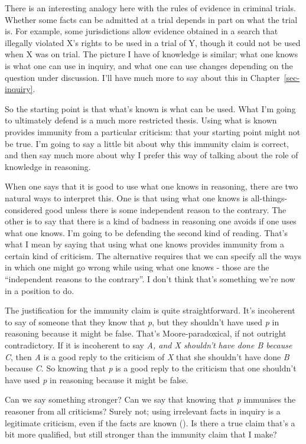 \documentclass[
  10pt,
  letterpaper,
  twoside]{scrbook}
\begin{document}
There is an interesting analogy here with the rules of evidence in
criminal trials. Whether some facts can be admitted at a trial depends
in part on what the trial is. For example, some jurisdictions allow
evidence obtained in a search that illegally violated X's rights to be
used in a trial of Y, though it could not be used when X was on trial.
The picture I have of knowledge is similar; what one knows is what one
can use in inquiry, and what one can use changes depending on the
question under discussion. I'll have much more to say about this in
Chapter~\ref{sec-inquiry}.

So the starting point is that what's known is what can be used. What I'm
going to ultimately defend is a much more restricted thesis. Using what
is known provides immunity from a particular criticism: that your
starting point might not be true. I'm going to say a little bit about
why this immunity claim is correct, and then say much more about why I
prefer this way of talking about the role of knowledge in reasoning.

When one says that it is good to use what one knows in reasoning, there
are two natural ways to interpret this. One is that using what one knows
is all-things-considered good unless there is some independent reason to
the contrary. The other is to say that there is a kind of badness in
reasoning one avoids if one uses what one knows. I'm going to be
defending the second kind of reading. That's what I mean by saying that
using what one knows provides immunity from a certain kind of criticism.
The alternative requires that we can specify all the ways in which one
might go wrong while using what one knows - those are the ``independent
reasons to the contrary''. I don't think that's something we're now in a
position to do.

The justification for the immunity claim is quite straightforward. It's
incoherent to say of someone that they know that \emph{p}, but they
shouldn't have used \emph{p} in reasoning because it might be false.
That's Moore-paradoxical, if not outright contradictory. If it is
incoherent to say \emph{A, and X shouldn't have done B because C}, then
\emph{A} is a good reply to the criticism of \emph{X} that she shouldn't
have done \emph{B} because \emph{C}. So knowing that \emph{p} is a good
reply to the criticism that one shouldn't have used \emph{p} in
reasoning because it might be false.

Can we say something stronger? Can we say that knowing that \emph{p}
immunises the reasoner from all criticisms? Surely not; using irrelevant
facts in inquiry is a legitimate criticism, even if the facts are known
(). Is there a true claim
that's a bit more qualified, but still stronger than the immunity claim
that I make?
\end{document}
